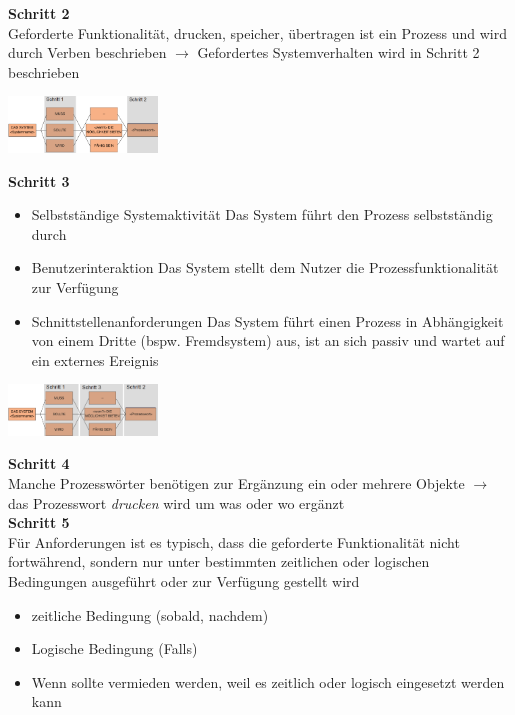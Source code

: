 \documentclass{report}
\newenvironment{Figure}
	{\par\medskip\noindent\minipage{\linewidth}}
	{\endminipage\par\medskip}
\theoremstyle{definition}
\theoremstyle{example}
\begin{document}
\textbf{Schritt 2}\\
Geforderte Funktionalität, drucken, speicher, übertragen ist ein Prozess und wird durch Verben beschrieben $\rightarrow$ Gefordertes Systemverhalten wird in Schritt 2 beschrieben
\begin{Figure}
   \centering
    \includegraphics[width=150px]{img/SatzSchablone2.png}
        \label{fig:Schritt zwei der Satzschablone}
\end{Figure}

\textbf{Schritt 3}
\begin{itemize}
   \item Selbstständige Systemaktivität
   \subitem Das System führt den Prozess selbstständig durch 
   \item Benutzerinteraktion
   \subitem Das System stellt dem Nutzer die Prozessfunktionalität zur Verfügung 
   \item Schnittstellenanforderungen
   \subitem Das System führt einen Prozess in Abhängigkeit von einem Dritte (bspw. Fremdsystem) aus, ist an sich passiv und wartet auf ein externes Ereignis 
\end{itemize}
\begin{Figure}
   \centering
    \includegraphics[width=150px]{img/SatzSchablone3.png}
        \label{fig:Schritt drei der Satzschablone}
\end{Figure}

\textbf{Schritt 4}\\
Manche Prozesswörter benötigen zur Ergänzung ein oder mehrere Objekte $\rightarrow$ das Prozesswort \textit{drucken} wird um was oder wo ergänzt\\

\textbf{Schritt 5}\\
Für Anforderungen ist es typisch, dass die geforderte Funktionalität nicht fortwährend, sondern nur unter bestimmten zeitlichen oder logischen Bedingungen ausgeführt oder zur Verfügung gestellt wird
\begin{itemize}
   \item zeitliche Bedingung (sobald, nachdem)
   \item Logische Bedingung (Falls)
   \item Wenn sollte vermieden werden, weil es zeitlich oder logisch eingesetzt werden kann
\end{itemize}
\end{document}
